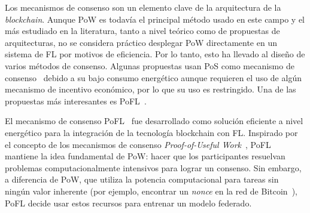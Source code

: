 Los mecanismos de consenso son un elemento clave de la arquitectura de la \textit{blockchain}. Aunque \ac{PoW} es todavía el principal método usado en este campo y el más estudiado en la literatura, tanto a nivel teórico como de propuestas de arquitecturas, no se considera práctico desplegar \ac{PoW} directamente en un sistema de \ac{FL} por motivos de eficiencia. Por lo tanto, esto ha llevado al diseño de varios métodos de consenso. Algunas propuestas usan \ac{PoS} como mecanismo de consenso~\cite{awan-2019, preuveneers-2018} debido a su bajo consumo energético aunque requieren el uso de algún mecanismo de incentivo económico, por lo que su uso es restringido. Una de las propuestas más interesantes es \ac{PoFL}~\cite{qu-2021-pofl}. 

El mecanismo de consenso \ac{PoFL}~\cite{qu-2021-pofl} fue desarrollado como solución eficiente a nivel energético para la integración de la tecnología blockchain con \ac{FL}. Inspirado por el concepto de los mecanismos de consenso \textit{Proof-of-Useful Work}~\cite{sabry-2023-pouw}, \ac{PoFL} mantiene la idea fundamental de \ac{PoW}: hacer que los participantes resuelvan problemas computacionalmente intensivos para lograr un consenso. Sin embargo, a diferencia de \ac{PoW}, que utiliza la potencia computacional para tareas sin ningún valor inherente (por ejemplo, encontrar un \textit{nonce} en la red de Bitcoin~\cite{duc-2023}), \ac{PoFL} decide usar estos recursos para entrenar un modelo federado.

